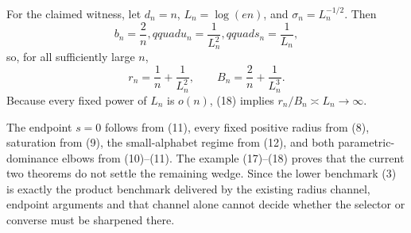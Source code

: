 For the claimed witness, let \(d_n=n\), \(L_n=\log(en)\), and \(\sigma_n=L_n^{-1/2}\).  Then
\[
 b_n=\frac2n,qquad u_n=\frac1{L_n^2},qquad s_n=\frac1{L_n},
\tag{17}
\]
so, for all sufficiently large \(n\),
\[
 r_n=\frac1n+\frac1{L_n^2},
 \qquad
 B_n=\frac2n+\frac1{L_n^3}.
\tag{18}
\]
Because every fixed power of \(L_n\) is \(o(n)\), (18) implies \(r_n/B_n\asymp L_n\to\infty\).

The endpoint \(s=0\) follows from (11), every fixed positive radius from (8), saturation from (9), the small-alphabet regime from (12), and both parametric-dominance elbows from (10)--(11).  The example (17)--(18) proves that the current two theorems do not settle the remaining wedge.  Since the lower benchmark (3) is exactly the product benchmark delivered by the existing radius channel, endpoint arguments and that channel alone cannot decide whether the selector or converse must be sharpened there.